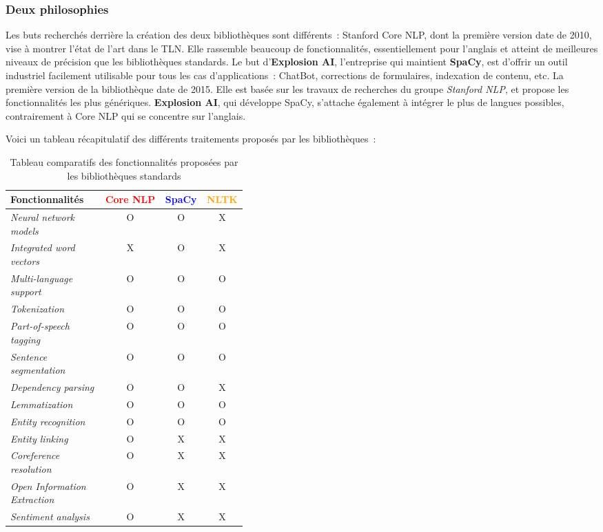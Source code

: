 \subsubsection{Deux philosophies}
Les buts recherchés derrière la création des deux bibliothèques sont différents~: Stanford Core NLP, dont la première version date de 2010, vise à montrer l'état de l'art dans le TLN. Elle rassemble beaucoup de fonctionnalités, essentiellement pour l'anglais et atteint de meilleures niveaux de précision que les bibliothèques standards. Le but d'\textbf{Explosion AI}, l'entreprise qui maintient \textbf{SpaCy}, est d'offrir un outil industriel facilement utilisable pour tous les cas d'applications~: ChatBot, corrections de formulaires, indexation de contenu, etc. La première version de la bibliothèque date de 2015. Elle est basée sur les travaux de recherches du groupe \textit{Stanford NLP}, et propose les fonctionnalités les plus génériques. \textbf{Explosion AI}, qui développe SpaCy, s'attache également à intégrer le plus de langues possibles, contrairement à Core NLP qui se concentre sur l'anglais.
\newline

Voici un tableau récapitulatif des différents traitements proposés par les bibliothèques~:
\vspace{10pt}
\begin{table}[H]
    \centering
    \begin{tabular}{| p{0.4\linewidth} | c | c | c |}
        \hline 
        \textbf{Fonctionnalités} &\textcolor{red}{Core NLP} &\textcolor{blue}{SpaCy} &\textcolor{orange}{NLTK}\\
        \hline
        \hline 
        \textit{Neural network models} &O &O &X\\
        \hline 
        \textit{Integrated word vectors} &X &O &X\\
        \hline 
        \textit{Multi-language support} &O &O &O\\
        \hline 
        \textit{Tokenization} &O &O &O\\
        \hline
        \textit{Part-of-speech tagging} &O &O &O\\		
        \hline 
        \textit{Sentence segmentation} &O &O &O\\
        \hline 
        \textit{Dependency parsing} &O &O &X\\
        \hline
        \textit{Lemmatization} &O &O &O\\
        \hline 
        \textit{Entity recognition} &O &O &O\\
        \hline 
        \textit{Entity linking} &O &X &X\\
        \hline 
        \textit{Coreference resolution} &O &X &X\\
        \hline 
        \textit{Open Information Extraction} &O &X &X\\
        \hline 
        \textit{Sentiment analysis} &O &X &X\\
        \hline
    \end{tabular}
    \caption{Tableau comparatifs des fonctionnalités proposées par les bibliothèques standards}
    \label{tab:nlp-compare}
\end{table}
\vspace{5pt}

